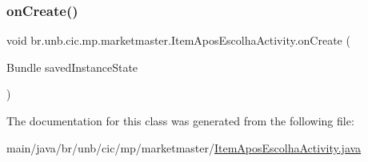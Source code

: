 \subsubsection{\texorpdfstring{on\+Create()}{onCreate()}}
{\footnotesize\ttfamily void br.\+unb.\+cic.\+mp.\+marketmaster.\+Item\+Apos\+Escolha\+Activity.\+on\+Create (\begin{DoxyParamCaption}\item[{Bundle}]{saved\+Instance\+State }\end{DoxyParamCaption})\hspace{0.3cm}{\ttfamily [protected]}}



The documentation for this class was generated from the following file\+:\begin{DoxyCompactItemize}
\item 
main/java/br/unb/cic/mp/marketmaster/\mbox{\hyperlink{ItemAposEscolhaActivity_8java}{Item\+Apos\+Escolha\+Activity.\+java}}\end{DoxyCompactItemize}
